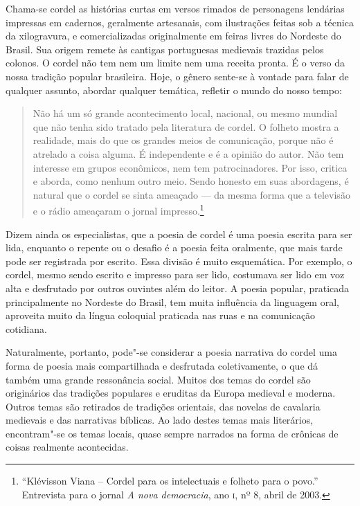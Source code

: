 \documentclass[11pt]{extarticle}
\begin{document}
Chama-se cordel as histórias curtas em versos rimados de personagens lendárias impressas em cadernos, geralmente artesanais, com ilustrações feitas sob a técnica da 
xilogravura, e comercializadas originalmente em feiras livres do Nordeste do Brasil. 
Sua origem remete às cantigas portuguesas medievais trazidas pelos colonos.
O cordel não tem nem um limite nem uma receita pronta. É o verso da 
nossa tradição popular brasileira. Hoje, o gênero sente-se à vontade para falar de qualquer 
assunto, abordar qualquer temática, refletir o mundo do nosso tempo:

\begin{quote}
Não há um só grande acontecimento local, nacional, ou mesmo mundial que não tenha sido tratado pela literatura de cordel. O folheto mostra a realidade, mais do que os grandes meios de comunicação, porque não é atrelado a coisa alguma. É independente e é a opinião do autor. Não tem interesse em grupos econômicos, nem tem patrocinadores. Por isso, critica e aborda, como nenhum outro meio. 
Sendo honesto em suas abordagens, é natural que o cordel se sinta ameaçado --- da mesma forma que  a televisão e o rádio ameaçaram o jornal impresso.\footnote{``Klévisson Viana -- Cordel para os intelectuais e folheto para o povo.'' Entrevista para o jornal \textit{A nova democracia}, ano \textsc{i}, nº 8, abril de 2003.}
\end{quote}

Dizem ainda os especialistas, que a poesia de cordel é uma poesia escrita para
ser lida, enquanto o repente ou o desafio é a poesia feita oralmente, que mais tarde pode
ser registrada por escrito. Essa divisão é muito esquemática. Por exemplo, o
cordel, mesmo sendo escrito e impresso para ser lido, costumava ser lido em
voz alta e desfrutado por outros ouvintes além do leitor. A poesia popular,
praticada principalmente no Nordeste do Brasil, tem muita influência da
linguagem oral, aproveita muito da língua coloquial praticada nas ruas e na
comunicação cotidiana. 

Naturalmente, portanto, pode"-se considerar a poesia narrativa do cordel uma
forma de poesia mais compartilhada e desfrutada coletivamente, o que dá também
uma grande ressonância social. Muitos dos temas do cordel são originários das
tradições populares e eruditas da Europa medieval e moderna. Outros temas são
retirados de tradições orientais, das novelas de cavalaria medievais e das narrativas
bíblicas. Ao lado destes temas mais literários, encontram"-se os temas locais,
quase sempre narrados na forma de crônicas de coisas realmente acontecidas.
\end{document}
